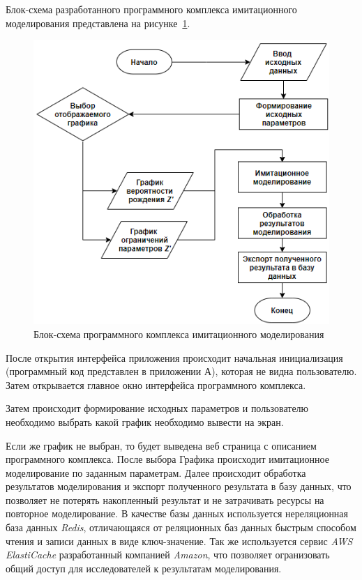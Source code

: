 Блок-схема разработанного программного комплекса имитационного
моделирования представлена на рисунке~\ref{fig:ui-block-schema}.

\begin{figure}[!h]
	\centering
	\includegraphics[width=\textwidth]{figures/ui-schema.png}
	\caption{Блок-схема программного комплекса имитационного моделирования}
	\label{fig:ui-block-schema}
\end{figure}

После открытия интерфейса приложения происходит начальная инициализация
(программный код представлен в приложении А), которая не видна
пользователю. Затем открывается главное окно интерфейса программного
комплекса.

Затем происходит формирование исходных параметров и пользователю
необходимо выбрать какой график необходимо вывести на экран. 

Если же
график не выбран, то будет выведена веб страница с описанием программного комплекса. После выбора Графика происходит имитационное моделирование по заданным параметрам. Далее
происходит обработка результатов моделирования и экспорт полученного
результата в базу данных, что позволяет не потерять накопленный результат и не затрачивать ресурсы на повторное моделирование. В качестве базы данных используется нереляционная база данных \textit{Redis}, отличающаяся от реляционных баз данных быстрым способом чтения и записи данных в виде ключ-значение. Так же используется сервис \textit{AWS ElastiCache}  разработанный компанией \textit{Amazon}, что позволяет огранизовать общий доступ для исследователей к результатам моделирования.